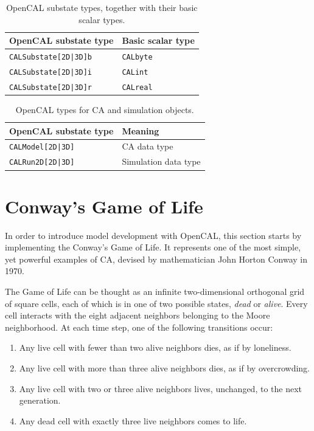 \begin{table}
  \centering
  \begin{tabular}{ll}
    \hline
    OpenCAL substate type & Basic scalar type \\
    \hline
    \verb'CALSubstate[2D|3D]b' & \verb'CALbyte'\\
    \verb'CALSubstate[2D|3D]i' & \verb'CALint' \\
    \verb'CALSubstate[2D|3D]r' & \verb'CALreal'\\
    \hline
  \end{tabular}
  \caption{OpenCAL substate types, together with their basic scalar
    types.}
  \label{tab:substate_types}
\end{table}

\begin{table}
  \centering
  \begin{tabular}{ll}
    \hline
    OpenCAL substate type & Meaning \\
    \hline
    \verb'CALModel[2D|3D]' & CA data type\\
    \verb'CALRun2D[2D|3D]' & Simulation data type\\
    \hline
  \end{tabular}
  \caption{OpenCAL types for CA and simulation objects.}
  \label{tab:ca_sim_types}
\end{table}


\section{Conway's Game of Life}\label{sec:cal_life}

In order to introduce model development with OpenCAL, this section
starts by implementing the Conway's Game of Life. It represents one of
the most simple, yet powerful examples of CA, devised by mathematician
John Horton Conway in 1970.

The Game of Life can be thought as an infinite two-dimensional
orthogonal grid of square cells, each of which is in one of two
possible states, \emph{dead} or \emph{alive}. Every cell interacts
with the eight adjacent neighbors belonging to the Moore
neighborhood. At each time step, one of the following transitions
occur:

\begin{enumerate}
    \item Any live cell with fewer than two alive neighbors dies, as
      if by loneliness.
    \item Any live cell with more than three alive neighbors dies, as
      if by overcrowding.
    \item Any live cell with two or three alive neighbors lives,
      unchanged, to the next generation.
    \item Any dead cell with exactly three live neighbors comes to
      life.
\end{enumerate}

